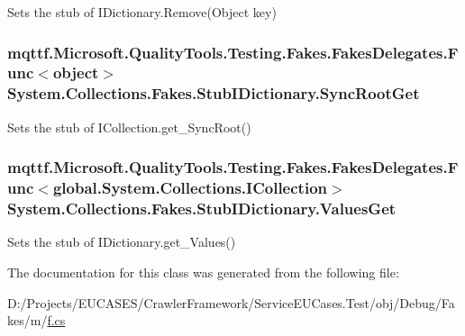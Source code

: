 Sets the stub of I\-Dictionary.\-Remove(\-Object key)

\hypertarget{class_system_1_1_collections_1_1_fakes_1_1_stub_i_dictionary_a01c6785e82e1aa1c7978532649082ce2}{
\subsubsection[{Sync\-Root\-Get}]{\setlength{\rightskip}{0pt plus 5cm}mqttf.\-Microsoft.\-Quality\-Tools.\-Testing.\-Fakes.\-Fakes\-Delegates.\-Func$<$object$>$ System.\-Collections.\-Fakes.\-Stub\-I\-Dictionary.\-Sync\-Root\-Get}}\label{class_system_1_1_collections_1_1_fakes_1_1_stub_i_dictionary_a01c6785e82e1aa1c7978532649082ce2}


Sets the stub of I\-Collection.\-get\-\_\-\-Sync\-Root()

\hypertarget{class_system_1_1_collections_1_1_fakes_1_1_stub_i_dictionary_a1547c9e269fee71e5e866c8e970f45de}{
\subsubsection[{Values\-Get}]{\setlength{\rightskip}{0pt plus 5cm}mqttf.\-Microsoft.\-Quality\-Tools.\-Testing.\-Fakes.\-Fakes\-Delegates.\-Func$<$global.\-System.\-Collections.\-I\-Collection$>$ System.\-Collections.\-Fakes.\-Stub\-I\-Dictionary.\-Values\-Get}}\label{class_system_1_1_collections_1_1_fakes_1_1_stub_i_dictionary_a1547c9e269fee71e5e866c8e970f45de}


Sets the stub of I\-Dictionary.\-get\-\_\-\-Values()



The documentation for this class was generated from the following file\-:\begin{DoxyCompactItemize}
\item 
D\-:/\-Projects/\-E\-U\-C\-A\-S\-E\-S/\-Crawler\-Framework/\-Service\-E\-U\-Cases.\-Test/obj/\-Debug/\-Fakes/m/\hyperlink{m_2f_8cs}{f.\-cs}\end{DoxyCompactItemize}
